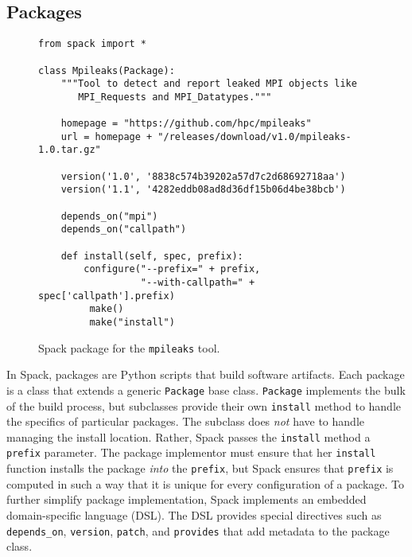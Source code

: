 
\subsection{Packages}\label{sec:packages}

\begin{figure}
\begin{verbatim}
from spack import *

class Mpileaks(Package):
    """Tool to detect and report leaked MPI objects like
       MPI_Requests and MPI_Datatypes."""

    homepage = "https://github.com/hpc/mpileaks"
    url = homepage + "/releases/download/v1.0/mpileaks-1.0.tar.gz"

    version('1.0', '8838c574b39202a57d7c2d68692718aa')
    version('1.1', '4282eddb08ad8d36df15b06d4be38bcb')

    depends_on("mpi")
    depends_on("callpath")

    def install(self, spec, prefix):
        configure("--prefix=" + prefix,
                  "--with-callpath=" + spec['callpath'].prefix)
         make()
         make("install")
\end{verbatim}
	\caption{
		Spack package for the {\tt mpileaks} tool.
		\label{fig:mpileaks}
	}
\end{figure}

In Spack, packages are Python scripts that build software artifacts.  
Each package is a class that extends a generic {\tt Package}
base class.  {\tt Package} implements the bulk of the build process, but
subclasses provide their own {\tt install} method to handle the
specifics of particular packages. The subclass does {\it not} have to
handle managing the install location.  Rather, Spack passes the {\tt install}
method a {\tt prefix} parameter.  The package implementor must ensure that
her {\tt install} function installs the package {\it into} the {\tt prefix},
but Spack ensures that {\tt prefix} is computed in such a way that it is
unique for every configuration of a package.  To further simplify 
package implementation, Spack implements an embedded domain-specific
language (DSL).
The DSL provides special directives such as {\tt depends\_on},
{\tt version}, {\tt patch}, and {\tt provides} that add metadata
to the package class.

